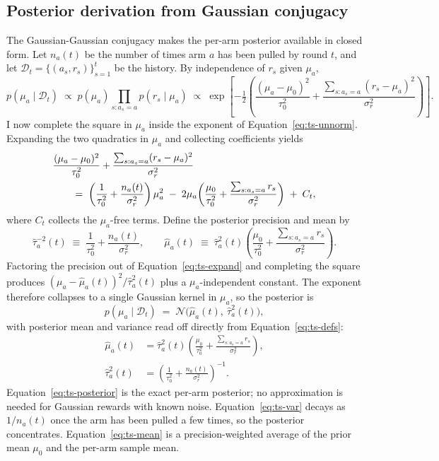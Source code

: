 \documentclass{article}
\begin{document}
\subsection{Posterior derivation from Gaussian conjugacy}

The Gaussian-Gaussian conjugacy makes the per-arm posterior available in closed form. Let $n_a(t)$ be the number of times arm $a$ has been pulled by round $t$, and let $\mathcal{D}_t = \{(a_s, r_s)\}_{s=1}^t$ be the history. By independence of $r_s$ given $\mu_a$,
\begin{equation}
p(\mu_a \mid \mathcal{D}_t) \;\propto\; p(\mu_a)\prod_{s: a_s = a} p(r_s \mid \mu_a) \;\propto\; \exp\!\left[-\tfrac{1}{2}\!\left(\frac{(\mu_a - \mu_0)^2}{\tau_0^2} + \frac{\sum_{s: a_s = a}(r_s - \mu_a)^2}{\sigma_r^2}\right)\right].
\label{eq:ts-unnorm}
\end{equation}
I now complete the square in $\mu_a$ inside the exponent of Equation~\ref{eq:ts-unnorm}. Expanding the two quadratics in $\mu_a$ and collecting coefficients yields
\begin{align}
&\frac{(\mu_a - \mu_0)^2}{\tau_0^2} + \frac{\sum_{s: a_s = a}(r_s - \mu_a)^2}{\sigma_r^2} \notag\\
&\qquad=\; \left(\frac{1}{\tau_0^2} + \frac{n_a(t)}{\sigma_r^2}\right)\mu_a^2 \;-\; 2\mu_a\!\left(\frac{\mu_0}{\tau_0^2} + \frac{\sum_{s: a_s = a} r_s}{\sigma_r^2}\right) \;+\; C_t,
\label{eq:ts-expand}
\end{align}
where $C_t$ collects the $\mu_a$-free terms. Define the posterior precision and mean by
\begin{equation}
\hat\tau_a^{-2}(t) \;\equiv\; \frac{1}{\tau_0^2} + \frac{n_a(t)}{\sigma_r^2}, \qquad \hat\mu_a(t) \;\equiv\; \hat\tau_a^{2}(t)\!\left(\frac{\mu_0}{\tau_0^2} + \frac{\sum_{s: a_s = a} r_s}{\sigma_r^2}\right).
\label{eq:ts-defs}
\end{equation}
Factoring the precision out of Equation~\ref{eq:ts-expand} and completing the square produces $(\mu_a - \hat\mu_a(t))^2 / \hat\tau_a^2(t)$ plus a $\mu_a$-independent constant. The exponent therefore collapses to a single Gaussian kernel in $\mu_a$, so the posterior is
\begin{equation}
p(\mu_a \mid \mathcal{D}_t) \;=\; \mathcal{N}\bigl(\hat\mu_a(t),\ \hat\tau_a^2(t)\bigr),
\label{eq:ts-posterior}
\end{equation}
with posterior mean and variance read off directly from Equation~\ref{eq:ts-defs}:
\begin{align}
\hat\mu_a(t) &= \hat\tau_a^2(t)\left(\frac{\mu_0}{\tau_0^2} + \frac{\sum_{s: a_s = a} r_s}{\sigma_r^2}\right), \label{eq:ts-mean}\\
\hat\tau_a^2(t) &= \left(\frac{1}{\tau_0^2} + \frac{n_a(t)}{\sigma_r^2}\right)^{-1}. \label{eq:ts-var}
\end{align}
Equation~\ref{eq:ts-posterior} is the exact per-arm posterior; no approximation is needed for Gaussian rewards with known noise. Equation~\ref{eq:ts-var} decays as $1/n_a(t)$ once the arm has been pulled a few times, so the posterior concentrates. Equation~\ref{eq:ts-mean} is a precision-weighted average of the prior mean $\mu_0$ and the per-arm sample mean.
\end{document}
